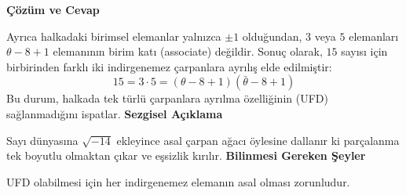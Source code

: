 \documentclass[11pt, a4paper]{article}
\newenvironment{cozum}{
    \vspace{0.5cm}
    \noindent\textcolor{green!60!black}{\faCheckCircle\enspace \textbf{\Large Çözüm ve Cevap}}\par\vspace{0.2cm}
}{}
\newenvironment{sezgisel}{
    \vspace{0.5cm}
    \noindent\textcolor{orange!80!black}{\faLightbulb\enspace \textbf{\Large Sezgisel Açıklama}}\par\vspace{0.2cm}
    \itshape
}{}
\newenvironment{bilgi}{
    \vspace{0.5cm}
    \noindent\textcolor{red!70!black}{\faExclamationTriangle\enspace \textbf{\Large Bilinmesi Gereken Şeyler}}\par\vspace{0.2cm}
}{}
\begin{document}
\begin{cozum}
Ayrıca halkadaki birimsel elemanlar yalnızca $\pm 1$ olduğundan, $3$ veya $5$ elemanları $\theta - 8 + 1$ elemanının birim katı (associate) değildir. Sonuç olarak, $15$ sayısı için birbirinden farklı iki indirgenemez çarpanlara ayrılış elde edilmiştir:
\[ 15 = 3 \cdot 5 = (\theta - 8 + 1)(\bar{\theta} - 8 + 1) \]
Bu durum, halkada tek türlü çarpanlara ayrılma özelliğinin (UFD) sağlanmadığını ispatlar.
\end{cozum}
\begin{sezgisel}
Sayı dünyasına $\sqrt{-14}$ ekleyince asal çarpan ağacı öylesine dallanır ki parçalanma tek boyutlu olmaktan çıkar ve eşsizlik kırılır.
\end{sezgisel}
\begin{bilgi}
UFD olabilmesi için her indirgenemez elemanın asal olması zorunludur.
\end{bilgi}

\newpage
\end{document}
